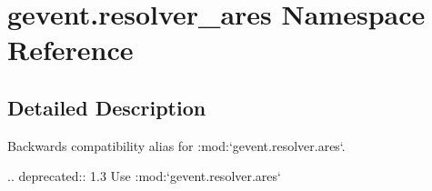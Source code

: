 \hypertarget{namespacegevent_1_1resolver__ares}{}\section{gevent.\+resolver\+\_\+ares Namespace Reference}
\label{namespacegevent_1_1resolver__ares}


\subsection{Detailed Description}
\begin{DoxyVerb}Backwards compatibility alias for :mod:`gevent.resolver.ares`.

.. deprecated:: 1.3
   Use :mod:`gevent.resolver.ares`
\end{DoxyVerb}
 